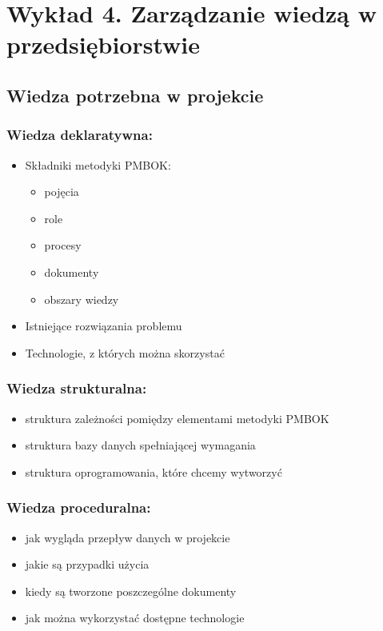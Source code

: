 \chapter{Wykład 4. Zarządzanie wiedzą w przedsiębiorstwie}

\section{Wiedza potrzebna w projekcie}

\subsection*{Wiedza deklaratywna:}
\begin{itemize}
\item Składniki metodyki PMBOK:
\begin{itemize}
\item pojęcia
\item role
\item procesy
\item dokumenty
\item obszary wiedzy
\end{itemize}
\item Istniejące rozwiązania problemu
\item Technologie, z których można skorzystać
\end{itemize}

\subsection*{Wiedza strukturalna:}
\begin{itemize}
\item struktura zależności pomiędzy elementami metodyki PMBOK
\item struktura bazy danych spełniającej wymagania
\item struktura oprogramowania, które chcemy wytworzyć
\end{itemize}

\subsection*{Wiedza proceduralna:}
\begin{itemize}
\item jak wygląda przepływ danych w projekcie
\item jakie są przypadki użycia
\item kiedy są tworzone poszczególne dokumenty
\item jak można wykorzystać dostępne technologie
\end{itemize}

